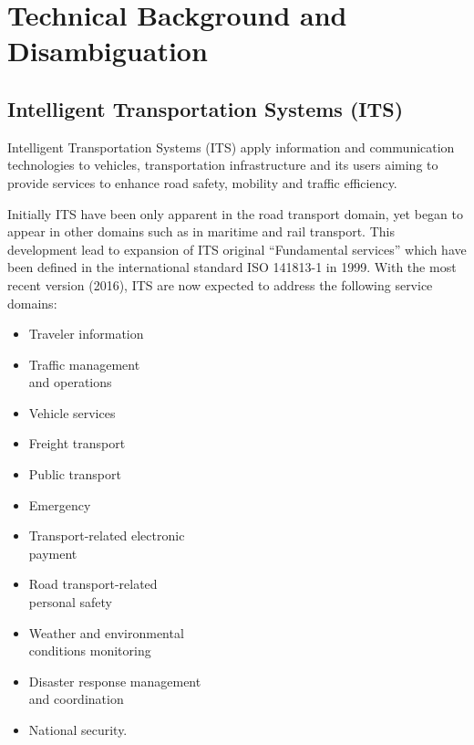 
\chapter{Technical Background and Disambiguation}
\label{cha:Disambiguation}

\section{Intelligent Transportation Systems (ITS)}
Intelligent Transportation Systems (ITS) apply information and communication technologies to vehicles, transportation infrastructure and its users aiming to provide services to enhance road safety, mobility and traffic efficiency. %



Initially ITS have been only apparent in the road transport domain, yet began to appear in other domains such as in maritime and rail transport. %
This development lead to expansion of ITS original ``Fundamental services'' which have been defined in the international standard ISO 141813-1 in 1999. %
With the most recent version (2016), ITS are now expected to address the following service domains:

\begin{multicols}{2}
    \begin{itemize}
        \item Traveler information
        \item Traffic management\\and operations
        \item Vehicle services
        \item Freight transport
        \item Public transport
        \item Emergency
        \columnbreak
        \item Transport-related electronic\\payment
        \item Road transport-related\\personal safety
        \item Weather and environmental\\conditions monitoring
        \item Disaster response management\\and coordination
        \item National security.
    \end{itemize}
\end{multicols}

